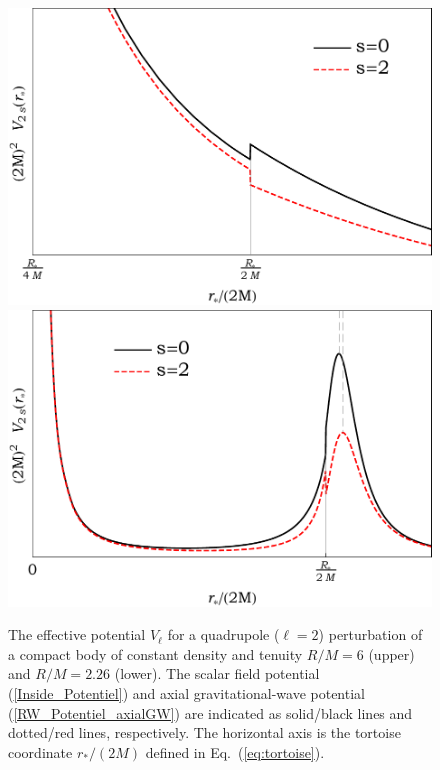 \documentclass[aps,prd,longbibliography,reprint,twocolumn,amsmath,amssymb,amsfonts,showpacs,superscriptaddress]{revtex4-1}%
\begin{document}
 \begin{figure}[htb]
\centering
 \includegraphics[scale=0.50]{potentials_s02_CD_R6L2_v3} \\ \vspace{0.2cm}
 \includegraphics[scale=0.50]{potentials_s02_CD_R2p26L2_v3}
\caption{\label{RP_approx_2Mw_3_6_s_1} The effective potential $V_\ell$ for a quadrupole ($\ell =2$) perturbation of a compact body of constant density and tenuity $R/M = 6$ (upper) and $R /M = 2.26$ (lower). The scalar field potential (\ref{Inside_Potentiel}) and axial gravitational-wave potential (\ref{RW_Potentiel_axialGW}) are indicated as solid/black lines and dotted/red lines, respectively. The horizontal axis is the tortoise coordinate $r_\ast/(2M)$ defined in Eq.~(\ref{eq:tortoise}).}
\label{fig:Veff}
\end{figure}
\end{document}
